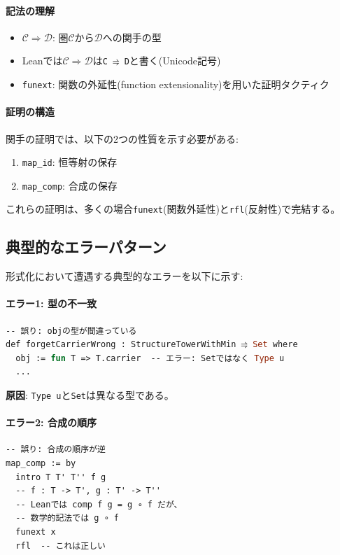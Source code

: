 \documentclass[a4paper,12pt]{article}
\theoremstyle{definition}
\begin{document}
\paragraph{記法の理解}
\begin{itemize}
\item $\mathcal{C} \Rightarrow \mathcal{D}$: 圏$\mathcal{C}$から$\mathcal{D}$への関手の型
\item Leanでは$\mathcal{C} \Rightarrow \mathcal{D}$は\texttt{C ⥤ D}と書く(Unicode記号)
\item \texttt{funext}: 関数の外延性(function extensionality)を用いた証明タクティク
\end{itemize}

\paragraph{証明の構造}
関手の証明では、以下の2つの性質を示す必要がある:
\begin{enumerate}
\item \texttt{map\_id}: 恒等射の保存
\item \texttt{map\_comp}: 合成の保存
\end{enumerate}

これらの証明は、多くの場合\texttt{funext}(関数外延性)と\texttt{rfl}(反射性)で完結する。

\subsection{典型的なエラーパターン}

形式化において遭遇する典型的なエラーを以下に示す:

\paragraph{エラー1: 型の不一致}
\begin{lstlisting}[style=leanstyle, language=ML]
-- 誤り: objの型が間違っている
def forgetCarrierWrong : StructureTowerWithMin ⥤ Set where
  obj := fun T => T.carrier  -- エラー: Setではなく Type u
  ...
\end{lstlisting}

\textbf{原因}: \texttt{Type u}と\texttt{Set}は異なる型である。

\paragraph{エラー2: 合成の順序}
\begin{lstlisting}[style=leanstyle, language=ML]
-- 誤り: 合成の順序が逆
map_comp := by
  intro T T' T'' f g
  -- f : T -> T', g : T' -> T''
  -- Leanでは comp f g = g ∘ f だが、
  -- 数学的記法では g ∘ f
  funext x
  rfl  -- これは正しい
\end{lstlisting}
\end{document}
